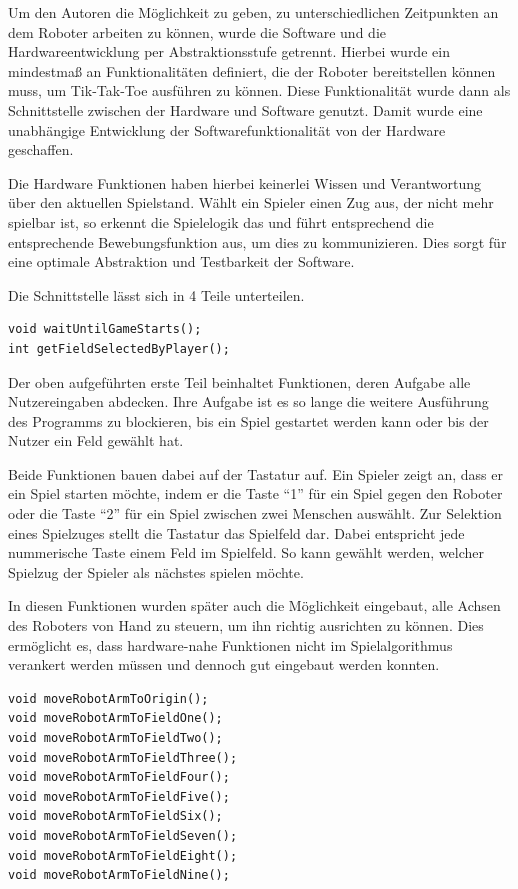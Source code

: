 \documentclass[conference,compsoc,final,a4paper]{IEEEtran}
\begin{document}
Um den Autoren die Möglichkeit zu geben, zu unterschiedlichen Zeitpunkten an dem Roboter arbeiten
zu können, wurde die Software und die Hardwareentwicklung per Abstraktionsstufe getrennt. Hierbei wurde
ein mindestmaß an Funktionalitäten definiert, die der Roboter bereitstellen können muss, um Tik-Tak-Toe
ausführen zu können. Diese Funktionalität wurde dann als Schnittstelle zwischen der Hardware und Software
genutzt. Damit wurde eine unabhängige Entwicklung der Softwarefunktionalität von der Hardware geschaffen.

Die Hardware Funktionen haben hierbei keinerlei Wissen und Verantwortung über den aktuellen Spielstand.
Wählt ein Spieler einen Zug aus, der nicht mehr spielbar ist, so erkennt die Spielelogik das und führt
entsprechend die entsprechende Bewebungsfunktion aus, um dies zu kommunizieren. Dies sorgt für eine
optimale Abstraktion und Testbarkeit der Software.

Die Schnittstelle lässt sich in 4 Teile unterteilen.

\begin{verbatim}
void waitUntilGameStarts();
int getFieldSelectedByPlayer();
\end{verbatim}

Der oben aufgeführten erste Teil beinhaltet Funktionen, deren Aufgabe alle Nutzereingaben abdecken.
Ihre Aufgabe ist es so lange die weitere Ausführung des Programms zu blockieren,
bis ein Spiel gestartet werden kann oder bis der Nutzer ein Feld gewählt hat.

Beide Funktionen bauen dabei auf der Tastatur auf. Ein Spieler zeigt an, dass er ein Spiel starten
möchte, indem er die Taste \enquote{1} für ein Spiel gegen den Roboter oder die Taste \enquote{2}
für ein Spiel zwischen zwei Menschen auswählt. Zur Selektion eines Spielzuges stellt die Tastatur
das Spielfeld dar. Dabei entspricht jede nummerische Taste einem Feld im Spielfeld. So kann
gewählt werden, welcher Spielzug der Spieler als nächstes spielen möchte.

In diesen Funktionen wurden später auch die Möglichkeit eingebaut, alle Achsen des Roboters von 
Hand zu steuern, um ihn richtig ausrichten zu können. Dies ermöglicht es, dass hardware-nahe Funktionen
nicht im Spielalgorithmus verankert werden müssen und dennoch gut eingebaut werden konnten.

\begin{verbatim}
void moveRobotArmToOrigin();
void moveRobotArmToFieldOne();
void moveRobotArmToFieldTwo();
void moveRobotArmToFieldThree();
void moveRobotArmToFieldFour();
void moveRobotArmToFieldFive();
void moveRobotArmToFieldSix();
void moveRobotArmToFieldSeven();
void moveRobotArmToFieldEight();
void moveRobotArmToFieldNine();
\end{verbatim}
\end{document}

